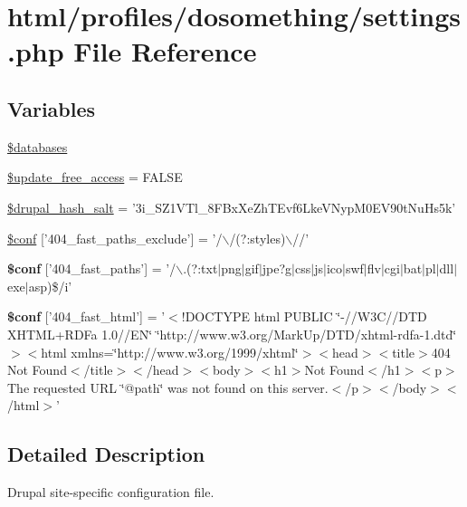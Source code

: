 \hypertarget{settings_8php}{
\section{html/profiles/dosomething/settings.php File Reference}
\label{settings_8php}
}
\subsection*{Variables}
\begin{DoxyCompactItemize}
\item 
\hyperlink{settings_8php_a97cde67402a68697692531e8b067f86f}{\$databases}
\item 
\hyperlink{settings_8php_afa06f20a6b90dec9a2573e779cd10b44}{\$update\_\-free\_\-access} = FALSE
\item 
\hyperlink{settings_8php_a75c981b07486dd3b07d5f122702dd87e}{\$drupal\_\-hash\_\-salt} = '3i\_\-SZ1VTl\_\-8FBxXeZhTEvf6LkeVNypM0EV90tNuHs5k'
\item 
\hyperlink{settings_8php_ad6ddcdefc93f69592fa04339ffd242c4}{\$conf} \mbox{[}'404\_\-fast\_\-paths\_\-exclude'\mbox{]} = '/$\backslash$/(?:styles)$\backslash$//'
\item 
\hypertarget{settings_8php_ab4cc4748965b0b394129e1559d6ce757}{
{\bfseries \$conf} \mbox{[}'404\_\-fast\_\-paths'\mbox{]} = '/$\backslash$.(?:txt$|$png$|$gif$|$jpe?g$|$css$|$js$|$ico$|$swf$|$flv$|$cgi$|$bat$|$pl$|$dll$|$exe$|$asp)\$/i'}
\label{settings_8php_ab4cc4748965b0b394129e1559d6ce757}

\item 
\hypertarget{settings_8php_a0f8ed56a2a313710a50f04d99d595599}{
{\bfseries \$conf} \mbox{[}'404\_\-fast\_\-html'\mbox{]} = '$<$!DOCTYPE html PUBLIC \char`\"{}-\///W3C//DTD XHTML+RDFa 1.0//EN\char`\"{} \char`\"{}http://www.w3.org/MarkUp/DTD/xhtml-\/rdfa-\/1.dtd\char`\"{}$>$$<$html xmlns=\char`\"{}http://www.w3.org/1999/xhtml\char`\"{}$>$$<$head$>$$<$title$>$404 Not Found$<$/title$>$$<$/head$>$$<$body$>$$<$h1$>$Not Found$<$/h1$>$$<$p$>$The requested URL \char`\"{}@path\char`\"{} was not found on this server.$<$/p$>$$<$/body$>$$<$/html$>$'}
\label{settings_8php_a0f8ed56a2a313710a50f04d99d595599}

\end{DoxyCompactItemize}


\subsection{Detailed Description}
Drupal site-\/specific configuration file.

